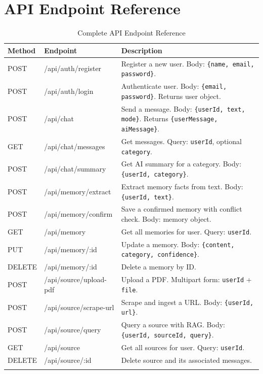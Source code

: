 \documentclass[12pt,a4paper]{report}
\begin{document}
\appendix
\chapter{API Endpoint Reference}

\begin{longtable}{@{}p{1.2cm} p{4.2cm} p{7.5cm}@{}}
\toprule
\textbf{Method} & \textbf{Endpoint} & \textbf{Description} \\
\midrule
\endhead
POST & /api/auth/register          & Register a new user. Body: \texttt{\{name, email, password\}}. \\
POST & /api/auth/login             & Authenticate user. Body: \texttt{\{email, password\}}. Returns user object. \\
POST & /api/chat                   & Send a message. Body: \texttt{\{userId, text, mode\}}. Returns \texttt{\{userMessage, aiMessage\}}. \\
GET  & /api/chat/messages          & Get messages. Query: \texttt{userId}, optional \texttt{category}. \\
POST & /api/chat/summary           & Get AI summary for a category. Body: \texttt{\{userId, category\}}. \\
POST & /api/memory/extract         & Extract memory facts from text. Body: \texttt{\{userId, text\}}. \\
POST & /api/memory/confirm         & Save a confirmed memory with conflict check. Body: memory object. \\
GET  & /api/memory                 & Get all memories for user. Query: \texttt{userId}. \\
PUT  & /api/memory/:id             & Update a memory. Body: \texttt{\{content, category, confidence\}}. \\
DELETE & /api/memory/:id           & Delete a memory by ID. \\
POST & /api/source/upload-pdf      & Upload a PDF. Multipart form: \texttt{userId} + \texttt{file}. \\
POST & /api/source/scrape-url      & Scrape and ingest a URL. Body: \texttt{\{userId, url\}}. \\
POST & /api/source/query           & Query a source with RAG. Body: \texttt{\{userId, sourceId, query\}}. \\
GET  & /api/source                 & Get all sources for user. Query: \texttt{userId}. \\
DELETE & /api/source/:id           & Delete source and its associated messages. \\
\bottomrule
\caption{Complete API Endpoint Reference}
\end{longtable}
\end{document}
